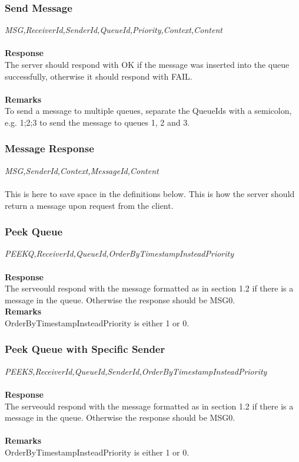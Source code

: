 \documentclass{article}
\begin{document}
            \subsubsection{Send Message}
                \indent\indent\textit{MSG,ReceiverId,SenderId,QueueId,Priority,Context,Content}\\
                \\
                \textbf{Response}\\
                The server should respond with OK if the message was inserted into the queue successfully, otherwise it should respond with FAIL.\\
                \\
                \textbf{Remarks}\\
                To send a message to multiple queues, separate the QueueIds with a semicolon, e.g. 1;2;3 to send the message to queues 1, 2 and 3.

            \subsubsection{Message Response}
                \indent\indent\textit{MSG,SenderId,Context,MessageId,Content}\\
                \\
                This is here to save space in the definitions below. This is how the server should return a message upon request from the client.

            \subsubsection{Peek Queue}
                \indent\indent \textit{PEEKQ,ReceiverId,QueueId,OrderByTimestampInsteadPriority}\\
                \\
                \textbf{Response}\\
                The serveould respond with the message formatted as in section 1.2 if there is a message in the queue. Otherwise the response should be MSG0.\\
                \textbf{Remarks}\\
                OrderByTimestampInsteadPriority is either 1 or 0.

            \subsubsection{Peek Queue with Specific Sender}
                \indent\indent\textit{PEEKS,ReceiverId,QueueId,SenderId,OrderByTimestampInsteadPriority}\\
            \\
            \textbf{Response}\\
            The serveould respond with the message formatted as in section 1.2 if there is a message in the queue. Otherwise the response should be MSG0.\\
            \\
            \textbf{Remarks}\\
            OrderByTimestampInsteadPriority is either 1 or 0.
\end{document}

